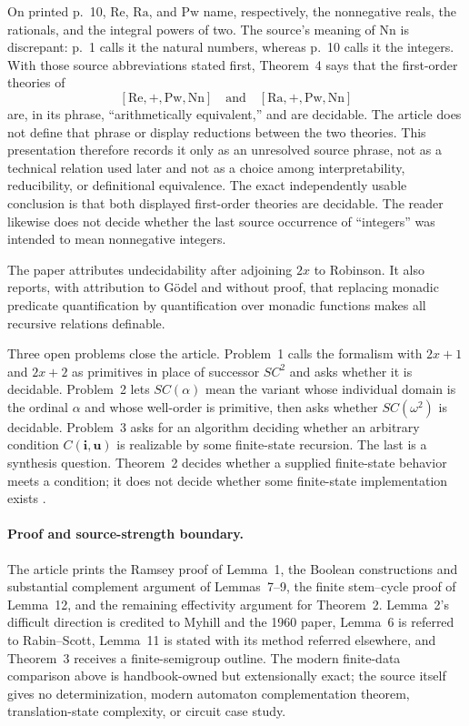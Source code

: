 On printed p.~10, \(\mathrm{Re}\), \(\mathrm{Ra}\), and \(\mathrm{Pw}\)
name, respectively, the nonnegative reals, the rationals, and the integral
powers of two.  The source's meaning of \(\mathrm{Nn}\) is discrepant: p.~1
calls it the natural numbers, whereas p.~10 calls it the integers.  With those
source abbreviations stated first, Theorem~4 says that the first-order theories
of
\[
 [\mathrm{Re},+,\mathrm{Pw},\mathrm{Nn}]
 \quad\text{and}\quad
 [\mathrm{Ra},+,\mathrm{Pw},\mathrm{Nn}]
\]
are, in its phrase, ``arithmetically equivalent,'' and are decidable.  The
article does not define that phrase or display reductions between the two
theories.  This presentation therefore records it only as an unresolved source
phrase, not as a technical relation used later and not as a choice among
interpretability, reducibility, or definitional equivalence.  The exact
independently usable conclusion is that both displayed first-order theories
are decidable.  The reader likewise does not decide whether the last source
occurrence of ``integers'' was intended to mean nonnegative integers.

The paper attributes undecidability after adjoining \(2x\) to Robinson.  It
also reports, with attribution to G\"odel and without proof, that replacing
monadic predicate quantification by quantification over monadic functions makes
all recursive relations definable.

Three open problems close the article.  Problem~1 calls the formalism with
\(2x+1\) and \(2x+2\) as primitives in place of successor \(SC^2\) and asks
whether it is decidable.  Problem~2 lets \(SC(\alpha)\) mean the variant whose
individual domain is the ordinal \(\alpha\) and whose well-order is primitive,
then asks whether \(SC(\omega^2)\) is decidable.  Problem~3 asks for an
algorithm deciding whether an arbitrary condition
\(C(\mathbf i,\mathbf u)\) is realizable by some finite-state recursion.  The
last is a synthesis question.  Theorem~2 decides whether a supplied
finite-state behavior meets a condition; it does not decide whether some
finite-state implementation exists \cite[p.~10]{Buchi1962}.

\paragraph{Proof and source-strength boundary.}
The article prints the Ramsey proof of Lemma~1, the Boolean constructions and
substantial complement argument of Lemmas~7--9, the finite stem--cycle proof of
Lemma~12, and the remaining effectivity argument for Theorem~2.  Lemma~2's
difficult direction is credited to Myhill and the 1960 paper, Lemma~6 is
referred to Rabin--Scott, Lemma~11 is stated with its method referred
elsewhere, and Theorem~3 receives a finite-semigroup outline.  The modern
finite-data comparison above is handbook-owned but extensionally
exact; the source itself gives no determinization, modern automaton
complementation theorem, translation-state complexity, or circuit case study.

